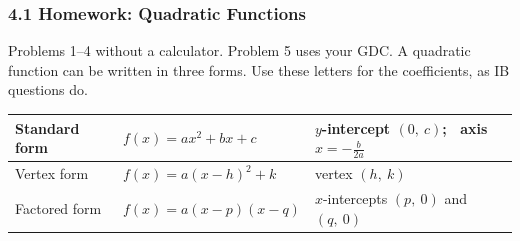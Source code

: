 \documentclass[12pt, twoside]{article}
\begin{document}
\subsubsection*{4.1 Homework: Quadratic Functions}

Problems 1--4 without a calculator. Problem 5 uses your GDC.
A quadratic function can be written in three forms. Use these letters for
the coefficients, as IB questions do.

\begin{center}
\renewcommand{\arraystretch}{1.5}
\begin{tabular}{|l|l|l|}
\hline
Standard form & $f(x) = ax^{2} + bx + c$ & $y$-intercept $(0,\ c)$; \
axis $x = -\tfrac{b}{2a}$ \\
\hline
Vertex form & $f(x) = a(x - h)^{2} + k$ & vertex $(h,\ k)$ \\
\hline
Factored form & $f(x) = a(x - p)(x - q)$ & $x$-intercepts $(p,\ 0)$ and
$(q,\ 0)$ \\
\hline
\end{tabular}
\end{center}
\end{document}
